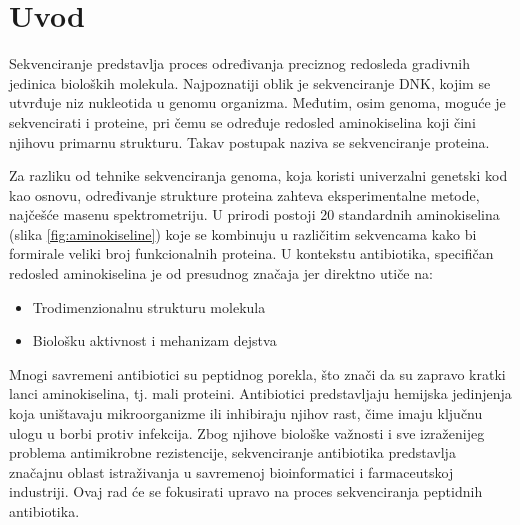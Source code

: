 \documentclass[12pt,oneside]{memoir}
\begin{document}

\frontmatter
\naslovna
\komisija
{}
\apstrakt
\tableofcontents*

\mainmatter

\chapter{Uvod}
Sekvenciranje predstavlja proces određivanja preciznog redosleda gradivnih jedinica bioloških molekula. Najpoznatiji oblik je sekvenciranje DNK, kojim se utvrđuje niz nukleotida u genomu organizma. Međutim, osim genoma, moguće je sekvencirati i proteine, pri čemu se određuje redosled aminokiselina koji čini njihovu primarnu strukturu. Takav postupak naziva se sekvenciranje proteina.

Za razliku od tehnike sekvenciranja genoma, koja koristi univerzalni genetski kod kao osnovu, određivanje strukture proteina zahteva eksperimentalne metode, najčešće masenu spektrometriju. U prirodi postoji 20 standardnih aminokiselina (slika \ref{fig:aminokiseline}) koje se kombinuju u različitim sekvencama kako bi formirale veliki broj funkcionalnih proteina. U kontekstu antibiotika, specifičan redosled aminokiselina je od presudnog značaja jer direktno utiče na:

\begin{itemize}
    \item Trodimenzionalnu strukturu molekula
    \item Biološku aktivnost i mehanizam dejstva
\end{itemize}

Mnogi savremeni antibiotici su peptidnog porekla, što znači da su zapravo kratki lanci aminokiselina, tj. mali proteini. Antibiotici predstavljaju hemijska jedinjenja koja uništavaju mikroorganizme ili inhibiraju njihov rast, čime imaju ključnu ulogu u borbi protiv infekcija. Zbog njihove biološke važnosti i sve izraženijeg problema antimikrobne rezistencije, sekvenciranje antibiotika predstavlja značajnu oblast istraživanja u savremenoj bioinformatici i farmaceutskoj industriji. Ovaj rad će se fokusirati upravo na proces sekvenciranja peptidnih antibiotika.
\end{document}
